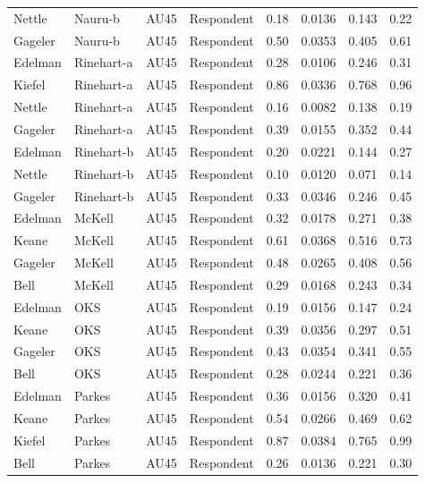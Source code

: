 \documentclass{monashthesis}
\begin{document}
\begin{center}
\begin{longtable}{llllllll}
Nettle & Nauru-b & AU45 & Respondent & 0.18 & 0.0136 & 0.143 & 0.22 \\
Gageler & Nauru-b & AU45 & Respondent & 0.50 & 0.0353 & 0.405 & 0.61 \\
Edelman & Rinehart-a & AU45 & Respondent & 0.28 & 0.0106 & 0.246 & 0.31 \\
Kiefel & Rinehart-a & AU45 & Respondent & 0.86 & 0.0336 & 0.768 & 0.96 \\
Nettle & Rinehart-a & AU45 & Respondent & 0.16 & 0.0082 & 0.138 & 0.19 \\
Gageler & Rinehart-a & AU45 & Respondent & 0.39 & 0.0155 & 0.352 & 0.44 \\
Edelman & Rinehart-b & AU45 & Respondent & 0.20 & 0.0221 & 0.144 & 0.27 \\
Nettle & Rinehart-b & AU45 & Respondent & 0.10 & 0.0120 & 0.071 & 0.14 \\
Gageler & Rinehart-b & AU45 & Respondent & 0.33 & 0.0346 & 0.246 & 0.45 \\
Edelman & McKell & AU45 & Respondent & 0.32 & 0.0178 & 0.271 & 0.38 \\
Keane & McKell & AU45 & Respondent & 0.61 & 0.0368 & 0.516 & 0.73 \\
Gageler & McKell & AU45 & Respondent & 0.48 & 0.0265 & 0.408 & 0.56 \\
Bell & McKell & AU45 & Respondent & 0.29 & 0.0168 & 0.243 & 0.34 \\
Edelman & OKS & AU45 & Respondent & 0.19 & 0.0156 & 0.147 & 0.24 \\
Keane & OKS & AU45 & Respondent & 0.39 & 0.0356 & 0.297 & 0.51 \\
Gageler & OKS & AU45 & Respondent & 0.43 & 0.0354 & 0.341 & 0.55 \\
Bell & OKS & AU45 & Respondent & 0.28 & 0.0244 & 0.221 & 0.36 \\
Edelman & Parkes & AU45 & Respondent & 0.36 & 0.0156 & 0.320 & 0.41 \\
Keane & Parkes & AU45 & Respondent & 0.54 & 0.0266 & 0.469 & 0.62 \\
Kiefel & Parkes & AU45 & Respondent & 0.87 & 0.0384 & 0.765 & 0.99 \\
Bell & Parkes & AU45 & Respondent & 0.26 & 0.0136 & 0.221 & 0.30 \\
\end{longtable}
\end{center}

\printbibliography[heading=bibintoc]
\end{document}
